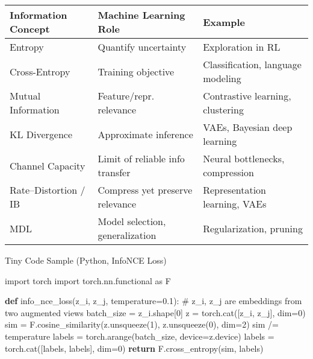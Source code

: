 \documentclass[
  letterpaper,
  DIV=11,
  numbers=noendperiod]{scrreprt}
\newenvironment{Shaded}{\begin{snugshade}}{\end{snugshade}}
\newcommand{\CommentTok}[1]{\textcolor[rgb]{0.37,0.37,0.37}{#1}}
\newcommand{\ControlFlowTok}[1]{\textcolor[rgb]{0.00,0.23,0.31}{\textbf{#1}}}
\newcommand{\DecValTok}[1]{\textcolor[rgb]{0.68,0.00,0.00}{#1}}
\newcommand{\FloatTok}[1]{\textcolor[rgb]{0.68,0.00,0.00}{#1}}
\newcommand{\ImportTok}[1]{\textcolor[rgb]{0.00,0.46,0.62}{#1}}
\newcommand{\KeywordTok}[1]{\textcolor[rgb]{0.00,0.23,0.31}{\textbf{#1}}}
\newcommand{\NormalTok}[1]{\textcolor[rgb]{0.00,0.23,0.31}{#1}}
\newcommand{\OperatorTok}[1]{\textcolor[rgb]{0.37,0.37,0.37}{#1}}
\begin{document}
\begin{longtable}[]{@{}
  >{\raggedright\arraybackslash}p{}
  >{\raggedright\arraybackslash}p{}
  >{\raggedright\arraybackslash}p{}@{}}
\toprule\noalign{}
\begin{minipage}[b]{\linewidth}\raggedright
Information Concept
\end{minipage} & \begin{minipage}[b]{\linewidth}\raggedright
Machine Learning Role
\end{minipage} & \begin{minipage}[b]{\linewidth}\raggedright
Example
\end{minipage} \\
\midrule\noalign{}
\endhead
\bottomrule\noalign{}
\endlastfoot
Entropy & Quantify uncertainty & Exploration in RL \\
Cross-Entropy & Training objective & Classification, language
modeling \\
Mutual Information & Feature/repr. relevance & Contrastive learning,
clustering \\
KL Divergence & Approximate inference & VAEs, Bayesian deep learning \\
Channel Capacity & Limit of reliable info transfer & Neural bottlenecks,
compression \\
Rate--Distortion / IB & Compress yet preserve relevance & Representation
learning, VAEs \\
MDL & Model selection, generalization & Regularization, pruning \\
\end{longtable}

Tiny Code Sample (Python, InfoNCE Loss)

\begin{Shaded}
\begin{Highlighting}[]
\ImportTok{import}\NormalTok{ torch}
\ImportTok{import}\NormalTok{ torch.nn.functional }\ImportTok{as}\NormalTok{ F}

\KeywordTok{def}\NormalTok{ info\_nce\_loss(z\_i, z\_j, temperature}\OperatorTok{=}\FloatTok{0.1}\NormalTok{):}
    \CommentTok{\# z\_i, z\_j are embeddings from two augmented views}
\NormalTok{    batch\_size }\OperatorTok{=}\NormalTok{ z\_i.shape[}\DecValTok{0}\NormalTok{]}
\NormalTok{    z }\OperatorTok{=}\NormalTok{ torch.cat([z\_i, z\_j], dim}\OperatorTok{=}\DecValTok{0}\NormalTok{)}
\NormalTok{    sim }\OperatorTok{=}\NormalTok{ F.cosine\_similarity(z.unsqueeze(}\DecValTok{1}\NormalTok{), z.unsqueeze(}\DecValTok{0}\NormalTok{), dim}\OperatorTok{=}\DecValTok{2}\NormalTok{)}
\NormalTok{    sim }\OperatorTok{/=}\NormalTok{ temperature}
\NormalTok{    labels }\OperatorTok{=}\NormalTok{ torch.arange(batch\_size, device}\OperatorTok{=}\NormalTok{z.device)}
\NormalTok{    labels }\OperatorTok{=}\NormalTok{ torch.cat([labels, labels], dim}\OperatorTok{=}\DecValTok{0}\NormalTok{)}
    \ControlFlowTok{return}\NormalTok{ F.cross\_entropy(sim, labels)}
\end{Highlighting}
\end{Shaded}
\end{document}
